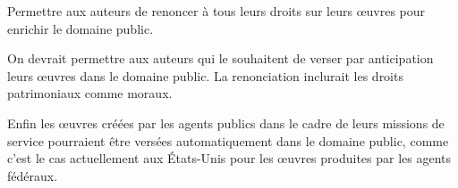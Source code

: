 \begin{mesure}
Permettre aux auteurs de renoncer à tous leurs droits sur leurs œuvres pour enrichir le domaine public.
\end{mesure}

On devrait permettre aux auteurs qui le souhaitent de verser par anticipation leurs œuvres dans le domaine public. La renonciation inclurait les droits patrimoniaux comme moraux. 

Enfin les œuvres créées par les agents publics dans le cadre de leurs missions de service pourraient être versées automatiquement dans le domaine public, comme c’est le cas actuellement aux États-Unis pour les œuvres produites par les agents fédéraux. 







